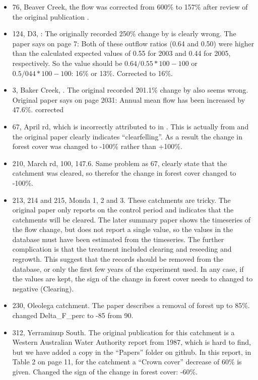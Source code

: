 \documentclass[]{elsarticle} %
\providecommand{\tightlist}{%
  \setlength{\itemsep}{0pt}\setlength{\parskip}{0pt}}
\begin{document}
\begin{itemize}
\tightlist
\item
  76, Beaver Creek, the flow was corrected from 600\% to 157\% after review of the original publication \citep{baker1984}.
\item
  124, D3, \citet{amatya2008effects}: The originally recorded 250\% change by \citet{zhang2017} is clearly wrong. The paper says on page 7: Both of these outflow ratios (0.64 and 0.50) were higher than the calculated expected values of 0.55 for 2003 and 0.44 for 2005, respectively. So the value should be \(0.64/0.55*100 - 100\) or \(0.5/044*100 - 100\): 16\% or 13\%. Corrected to 16\%.
\item
  3, Baker Creek, \citet{zhangwei2012}. The original recorded 201.1\% change by \citet{zhang2017} also seems wrong. Original paper says on page 2031: Annual mean flow has been increased by 47.6\%. corrected\\
\item
  67, April rd, which is incorrectly attributed to \citet{ruprecht1991} in \citet{zhang2017}. This is actually from \citet{ruprecht1989} and the original paper clearly indicates ``clearfelling''. As a result the change in forest cover was changed to -100\% rather than +100\%.
\item
  210, March rd, 100, 147.6. Same problem as 67, \citet{bari1996} clearly state that the catchment was cleared, so therefor the change in forest cover changed to -100\%.
\item
  213, 214 and 215, Monda 1, 2 and 3. These catchments are tricky. The original paper \citep{oshaughnessy1979} only reports on the control period and indicates that the catchments will be cleared. The later summary paper \citep{watson2001} shows the timeseries of the flow change, but does not report a single value, so the values in the database must have been estimated from the timeseries. The further complication is that the treatment included clearing and reseeding and regrowth. This suggest that the records should be removed from the database, or only the first few years of the experiment used. In any case, if the values are kept, the sign of the change in forest cover needs to changed to negative (Clearing).
\item
  230, Oleolega catchment. The paper describes a removal of forest up to 85\%. changed Delta\_F\_perc to -85 from 90.
\item
  312, Yerraminup South. The original publication for this catchment is a Western Australian Water Authority report from 1987, which is hard to find, but we have added a copy in the ``Papers'' folder on github. In this report, in Table 2 on page 11, for the catchment a ``Crown cover'' decrease of 60\% is given. Changed the sign of the change in forest cover: -60\%.

\end{itemize}
\end{document}
